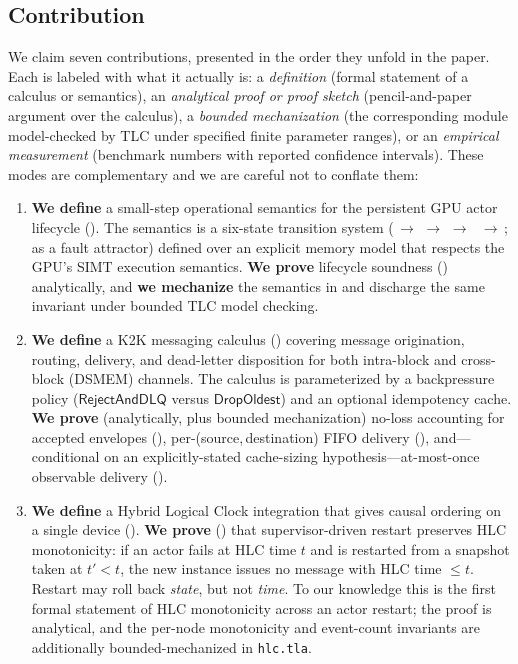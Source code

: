 \subsection{Contribution}

We claim seven contributions, presented in the order they unfold in
the paper.  Each is labeled with what it actually is: a
\emph{definition} (formal statement of a calculus or semantics), an
\emph{analytical proof or proof sketch} (pencil-and-paper argument
over the calculus), a \emph{bounded mechanization} (the corresponding
\TLA{} module model-checked by TLC under specified finite parameter
ranges), or an \emph{empirical measurement} (benchmark numbers with
reported confidence intervals).  These modes are complementary and
we are careful not to conflate them:

\begin{enumerate}
\item \textbf{We define} a small-step operational semantics for the
persistent GPU actor lifecycle ().  The semantics is
a six-state transition system
(\Dormant{}\,\(\to\)\,\Initializing{}\,\(\to\)\,\Active{}\,\(\to\)\,
\Draining{}\,\(\to\)\,\Terminated{}; \Failed{} as a fault attractor)
defined over an explicit memory model that respects the GPU's SIMT
execution semantics.  \textbf{We prove} lifecycle soundness
() analytically, and \textbf{we
mechanize} the semantics in \TLA{} and discharge the same invariant
under bounded TLC model checking.

\item \textbf{We define} a K2K messaging calculus ()
covering message origination, routing, delivery, and dead-letter
disposition for both intra-block and cross-block (DSMEM) channels.
The calculus is parameterized by a backpressure policy
(\(\mathsf{RejectAndDLQ}\) versus \(\mathsf{DropOldest}\)) and an
optional idempotency cache.  \textbf{We prove} (analytically, plus
bounded mechanization) no-loss accounting for accepted envelopes
(), per-(source,\,destination) FIFO
delivery (), and—conditional on an
explicitly-stated cache-sizing hypothesis—at-most-once observable
delivery ().

\item \textbf{We define} a Hybrid Logical Clock integration that
gives causal ordering on a single device ().
\textbf{We prove} () that
supervisor-driven restart preserves HLC monotonicity: if an actor
fails at HLC time \(t\) and is restarted from a snapshot taken at
\(t' < t\), the new instance issues no message with HLC time
\(\le t\).  Restart may roll back \emph{state}, but not
\emph{time}.  To our knowledge this is the first formal statement
of HLC monotonicity across an actor restart; the proof is
analytical, and the per-node monotonicity and event-count
invariants are additionally bounded-mechanized in
\texttt{hlc.tla}.


\end{enumerate}
